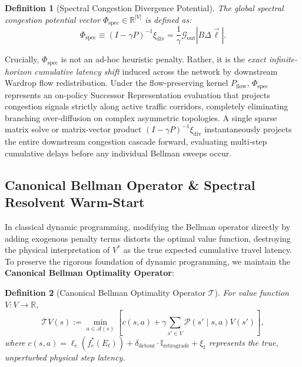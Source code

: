 \documentclass[11pt,a4paper]{article}
\newtheorem{definition}{Definition}
\begin{document}
\begin{definition}[Spectral Congestion Divergence Potential]
The global spectral congestion potential vector $\Phi_{\text{spec}} \in \mathbb{R}^{|V|}$ is defined as:
\begin{equation}
\Phi_{\text{spec}} \equiv (I - \gamma P)^{-1} \xi_{\text{div}} = \frac{1}{\gamma} \mathcal{G}_{\text{out}} |B \Delta \vec{\ell}|.
\end{equation}
\end{definition}

Crucially, $\Phi_{\text{spec}}$ is not an ad-hoc heuristic penalty. Rather, it is the \textit{exact infinite-horizon cumulative latency shift} induced across the network by downstream Wardrop flow redistribution. Under the flow-preserving kernel $P_{\text{flow}}$, $\Phi_{\text{spec}}$ represents an on-policy Successor Representation evaluation that projects congestion signals strictly along active traffic corridors, completely eliminating branching over-diffusion on complex asymmetric topologies. A single sparse matrix solve or matrix-vector product $(I - \gamma P)^{-1} \xi_{\text{div}}$ instantaneously projects the entire downstream congestion cascade forward, evaluating multi-step cumulative delays before any individual Bellman sweeps occur.

\subsection{Canonical Bellman Operator \& Spectral Resolvent Warm-Start}
\label{subsec:spectral_bellman}
In classical dynamic programming, modifying the Bellman operator directly by adding exogenous penalty terms distorts the optimal value function, destroying the physical interpretation of $V^*$ as the true expected cumulative travel latency. To preserve the rigorous foundation of dynamic programming, we maintain the \textbf{Canonical Bellman Optimality Operator}:

\begin{definition}[Canonical Bellman Optimality Operator $\mathcal{T}$]
For value function $V: V \to \mathbb{R}$,
\begin{equation}
\label{eq:canonical_bellman}
\mathcal{T} V(s) := \min_{a \in \mathcal{A}(s)} \left[ c(s, a) + \gamma \sum_{s' \in V} \mathcal{P}(s' \mid s, a) V(s') \right],
\end{equation}
where $c(s, a) = \ell_e(f_e^*(E_t)) + \delta_{\text{detour}} \cdot \mathbb{I}_{\text{retrograde}} + \xi_t$ represents the true, unperturbed physical step latency.
\end{definition}
\end{document}
